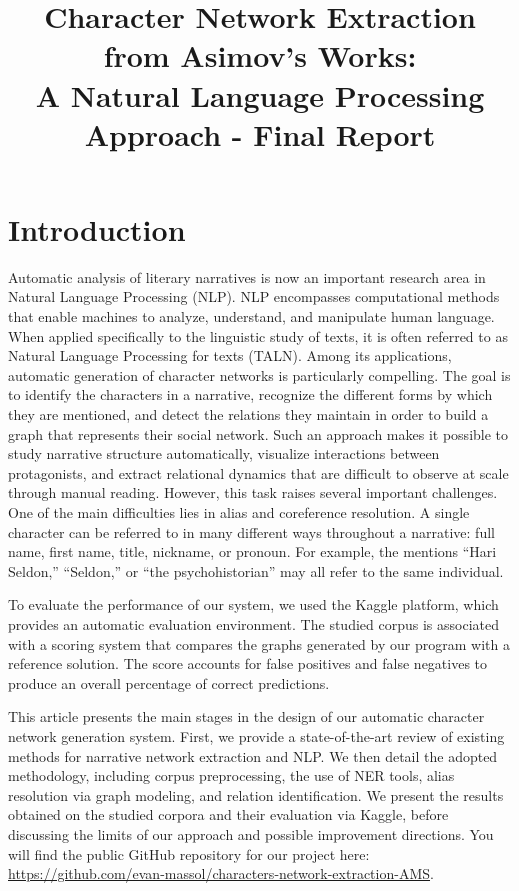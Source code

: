 \documentclass[a4paper]{article}
\title{Character Network Extraction from Asimov's Works: \\
A Natural Language Processing Approach - Final Report}
\begin{document}
\maketitle
\pagestyle{plain}
\thispagestyle{plain}

\section{Introduction}

Automatic analysis of literary narratives is now an important research area in Natural Language Processing (NLP). NLP encompasses computational methods that enable machines to analyze, understand, and manipulate human language. When applied specifically to the linguistic study of texts, it is often referred to as Natural Language Processing for texts (TALN). Among its applications, automatic generation of character networks is particularly compelling. The goal is to identify the characters in a narrative, recognize the different forms by which they are mentioned, and detect the relations they maintain in order to build a graph that represents their social network. Such an approach makes it possible to study narrative structure automatically, visualize interactions between protagonists, and extract relational dynamics that are difficult to observe at scale through manual reading. However, this task raises several important challenges. One of the main difficulties lies in alias and coreference resolution. A single character can be referred to in many different ways throughout a narrative: full name, first name, title, nickname, or pronoun. For example, the mentions “Hari Seldon,” “Seldon,” or “the psychohistorian” may all refer to the same individual.

To evaluate the performance of our system, we used the Kaggle platform, which provides an automatic evaluation environment. The studied corpus is associated with a scoring system that compares the graphs generated by our program with a reference solution. The score accounts for false positives and false negatives to produce an overall percentage of correct predictions.

This article presents the main stages in the design of our automatic character network generation system. First, we provide a state-of-the-art review of existing methods for narrative network extraction and NLP. We then detail the adopted methodology, including corpus preprocessing, the use of NER tools, alias resolution via graph modeling, and relation identification. We present the results obtained on the studied corpora and their evaluation via Kaggle, before discussing the limits of our approach and possible improvement directions. You will find the public GitHub repository for our project here: \url{https://github.com/evan-massol/characters-network-extraction-AMS}.
\end{document}
